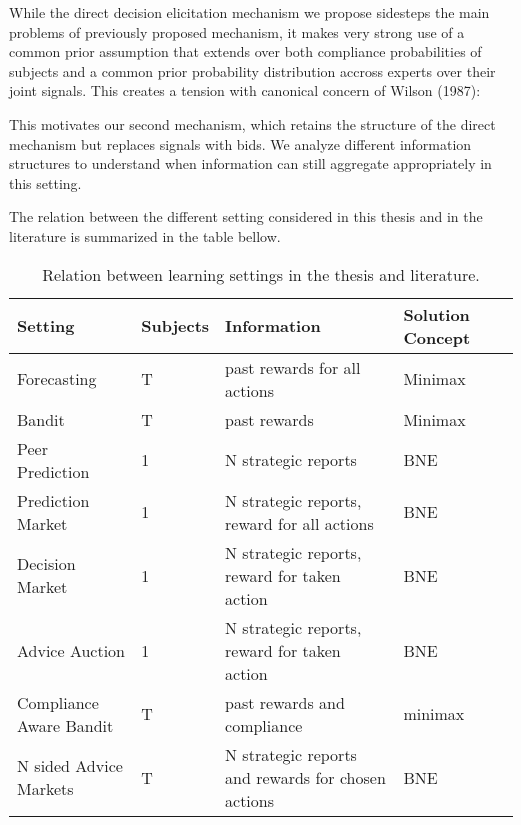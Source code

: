 While the direct decision elicitation mechanism we propose sidesteps the main problems of previously proposed mechanism, it makes very strong use of a common prior assumption that extends over both compliance probabilities of subjects and a common prior probability distribution accross experts over their joint signals. This creates a tension with canonical concern of Wilson (1987):


This motivates our second mechanism, which retains the structure of the direct mechanism but replaces signals with bids. We analyze different information structures to understand when information can still aggregate appropriately in this setting.

The relation between the different setting considered in this thesis and in the literature is summarized in the table bellow.

\begin{table}
	\begin{tabular}{lllll}
		\toprule
		Setting & Subjects & Information & Solution Concept\\
		\midrule
		Forecasting & T  & past rewards for all actions & Minimax  \\
		Bandit & T  & past rewards &  Minimax  \\
		Peer Prediction & 1 & N strategic reports & BNE \\
		Prediction Market & 1 & N strategic reports, reward for all actions &  BNE\\
		Decision Market & 1 & N strategic reports, reward for taken action & BNE  \\
		Advice Auction  & 1 & N strategic reports, reward for taken action & BNE  \\
		Compliance Aware Bandit & T  & past rewards and compliance & minimax \\
		N sided Advice Markets  & T  &  N strategic reports and rewards for chosen actions & BNE  \\
		\bottomrule
	\end{tabular}
	\caption{Relation between learning settings in the thesis and literature.}
\end{table}


